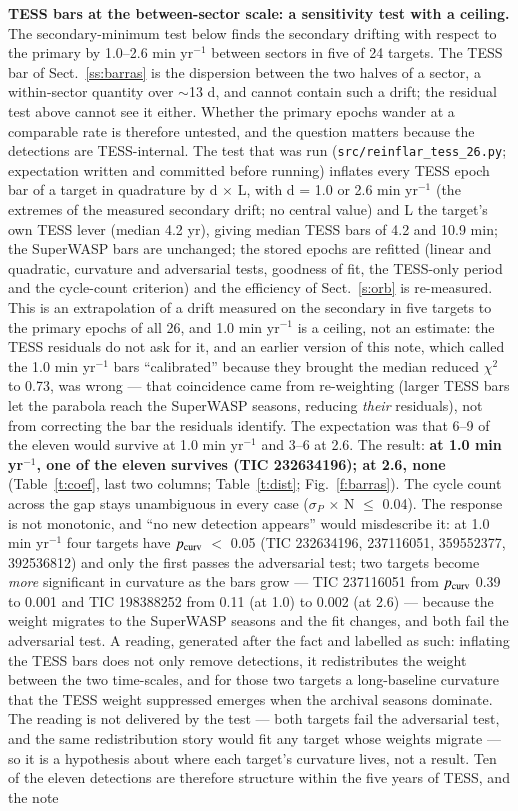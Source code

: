 \documentclass{aa}
\begin{document}
\textbf{TESS bars at the between-sector scale: a sensitivity test with a ceiling.} The secondary-minimum test below finds the secondary drifting with respect to the primary by 1.0--2.6 min yr$^{-1}$ between sectors in five of 24 targets. The TESS bar of Sect.~\ref{ss:barras} is the dispersion between the two halves of a sector, a within-sector quantity over $\sim$13 d, and cannot contain such a drift; the residual test above cannot see it either. Whether the primary epochs wander at a comparable rate is therefore untested, and the question matters because the detections are TESS-internal. The test that was run (\texttt{src/reinflar\_tess\_26.py}; expectation written and committed before running) inflates every TESS epoch bar of a target in quadrature by d $\times$ L, with d = 1.0 or 2.6 min yr$^{-1}$ (the extremes of the measured secondary drift; no central value) and L the target's own TESS lever (median 4.2 yr), giving median TESS bars of 4.2 and 10.9 min; the SuperWASP bars are unchanged; the stored epochs are refitted (linear and quadratic, curvature and adversarial tests, goodness of fit, the TESS-only period and the cycle-count criterion) and the efficiency of Sect.~\ref{s:orb} is re-measured. This is an extrapolation of a drift measured on the secondary in five targets to the primary epochs of all 26, and 1.0 min yr$^{-1}$ is a ceiling, not an estimate: the TESS residuals do not ask for it, and an earlier version of this note, which called the 1.0 min yr$^{-1}$ bars ``calibrated'' because they brought the median reduced $\chi^2$ to 0.73, was wrong --- that coincidence came from re-weighting (larger TESS bars let the parabola reach the SuperWASP seasons, reducing \emph{their} residuals), not from correcting the bar the residuals identify. The expectation was that 6--9 of the eleven would survive at 1.0 min yr$^{-1}$ and 3--6 at 2.6. The result: \textbf{at 1.0 min yr$^{-1}$, one of the eleven survives (TIC 232634196); at 2.6, none} (Table~\ref{t:coef}, last two columns; Table~\ref{t:dist}; Fig.~\ref{f:barras}). The cycle count across the gap stays unambiguous in every case ($\sigma_P$ $\times$ N $\le$ 0.04). The response is not monotonic, and ``no new detection appears'' would misdescribe it: at 1.0 min yr$^{-1}$ four targets have $p_{\rm curv}$ $<$ 0.05 (TIC 232634196, 237116051, 359552377, 392536812) and only the first passes the adversarial test; two targets become \emph{more} significant in curvature as the bars grow --- TIC 237116051 from $p_{\rm curv}$ 0.39 to 0.001 and TIC 198388252 from 0.11 (at 1.0) to 0.002 (at 2.6) --- because the weight migrates to the SuperWASP seasons and the fit changes, and both fail the adversarial test. A reading, generated after the fact and labelled as such: inflating the TESS bars does not only remove detections, it redistributes the weight between the two time-scales, and for those two targets a long-baseline curvature that the TESS weight suppressed emerges when the archival seasons dominate. The reading is not delivered by the test --- both targets fail the adversarial test, and the same redistribution story would fit any target whose weights migrate --- so it is a hypothesis about where each target's curvature lives, not a result. Ten of the eleven detections are therefore structure within the five years of TESS, and the note 
\end{document}
